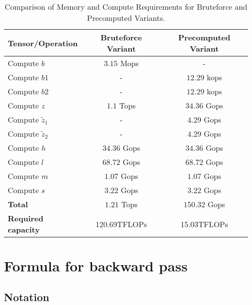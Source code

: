 \documentclass{article}
\begin{document}
\begin{table}[ht]
\centering
\begin{tabular}{|l|c|c|}
\hline
\textbf{Tensor/Operation} & \textbf{Bruteforce Variant} & \textbf{Precomputed Variant} \\ \hline
Compute $b$ & $3.15$ Mops & - \\ \hline
Compute $b1$ & - & $12.29$ kops \\ \hline
Compute $b2$ & - & $12.29$ kops \\ \hline
Compute $z$ & $1.1$ Tops & $34.36$ Gops \\ \hline
Compute $\tilde{z}_1$ & - & $4.29$ Gops \\ \hline
Compute $\tilde{z}_2$ & - & $4.29$ Gops \\ \hline
Compute $h$ & $34.36$ Gops & $34.36$ Gops \\ \hline
Compute $l$ & $68.72$ Gops & $68.72$ Gops \\ \hline
Compute $m$ & $1.07$ Gops & $1.07$ Gops \\ \hline
Compute $s$ & $3.22$ Gops & $3.22$ Gops \\ \hline
\textbf{Total} & $1.21$ Tops & $150.32$ Gops \\ \hline
\textbf{Required capacity} & 120.69TFLOPs & 15.03TFLOPs \\ \hline
\end{tabular}
\caption{Comparison of Memory and Compute Requirements for Bruteforce and Precomputed Variants.}
\label{table:variants-comparison}
\end{table}

\section{Formula for backward pass} \label{appendix_backward_pass}

\subsection*{Notation}
\end{document}
